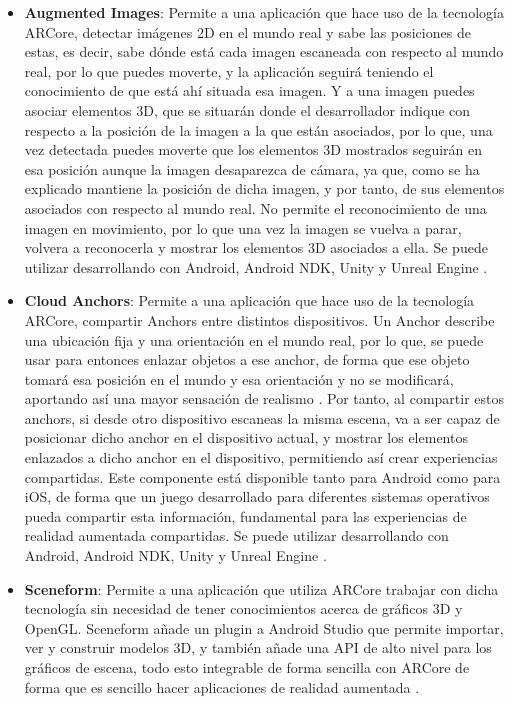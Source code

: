 \begin{itemize}
  \item \textbf{Augmented Images}: Permite a una aplicación que hace uso de la tecnología ARCore, detectar imágenes 2D en el mundo real y sabe las posiciones de estas, es decir, sabe dónde está cada imagen escaneada con respecto al mundo real, por lo que puedes moverte, y la aplicación seguirá teniendo el conocimiento de que está ahí situada esa imagen. Y a una imagen puedes asociar elementos 3D, que se situarán donde el desarrollador indique con respecto a la posición de la imagen a la que están asociados, por lo que, una vez detectada puedes moverte que los elementos 3D mostrados seguirán en esa posición aunque la imagen desaparezca de cámara, ya que, como se ha explicado mantiene la posición de dicha imagen, y por tanto, de sus elementos asociados con respecto al mundo real. No permite el reconocimiento de una imagen en movimiento, por lo que una vez la imagen se vuelva a parar, volvera a reconocerla y mostrar los elementos 3D asociados a ella. Se puede utilizar desarrollando con Android, Android NDK, Unity y Unreal Engine \cite{arcore-augmented-images}.

  \item \textbf{Cloud Anchors}: Permite a una aplicación que hace uso de la tecnología ARCore, compartir Anchors entre distintos dispositivos. Un Anchor describe una ubicación fija y una orientación en el mundo real, por lo que, se puede usar para entonces enlazar objetos a ese anchor, de forma que ese objeto tomará esa posición en el mundo y esa orientación y no se modificará, aportando así una mayor sensación de realismo \cite{arcore-anchors}. Por tanto, al compartir estos anchors, si desde otro dispositivo escaneas la misma escena, va a ser capaz de posicionar dicho anchor en el dispositivo actual, y mostrar los elementos enlazados a dicho anchor en el dispositivo, permitiendo así crear experiencias compartidas. Este componente está disponible tanto para Android como para iOS, de forma que un juego desarrollado para diferentes sistemas operativos pueda compartir esta información, fundamental para las experiencias de realidad aumentada compartidas. Se puede utilizar desarrollando con Android, Android NDK, Unity y Unreal Engine \cite{arcore-cloud-anchors}.

  \item \textbf{Sceneform}: Permite a una aplicación que utiliza ARCore trabajar con dicha tecnología sin necesidad de tener conocimientos acerca de gráficos 3D y OpenGL. Sceneform añade un plugin a Android Studio que permite importar, ver y construir modelos 3D, y también añade una API de alto nivel para los gráficos de escena, todo esto integrable de forma sencilla con ARCore de forma que es sencillo hacer aplicaciones de realidad aumentada \cite{arcore-sceneform}.

\end{itemize}

